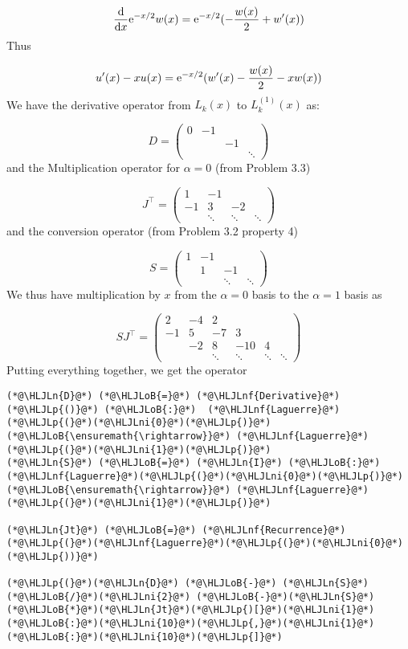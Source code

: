\documentclass[12pt,a4paper]{article}
\newcommand{\HLJLn}[1]{#1}
\newcommand{\HLJLnf}[1]{\textcolor[RGB]{66,102,213}{#1}}
\newcommand{\HLJLni}[1]{\textcolor[RGB]{59,151,46}{#1}}
\newcommand{\HLJLoB}[1]{\textcolor[RGB]{102,102,102}{\textbf{#1}}}
\newcommand{\HLJLp}[1]{#1}
\def\D{ {\rm d} }
\def\E{ {\rm e} }
\def\dx{\D x}
\begin{document}
\[
{\D \over \dx} \E^{-x/2} w(x) =  \E^{-x/2} (-{w(x) \over 2} +w'(x))
\]
Thus

\[
u'(x) - xu(x)  = \E^{-x/2} (w'(x) -{w(x) \over 2} - x w(x))
\]
We have the derivative operator from $L_k(x)$ to $L_k^{(1)}(x)$ as:

\[
D = \begin{pmatrix}
0 & -1 \\
  &&-1 \\
  &&&\ddots
\end{pmatrix}
\]
and the Multiplication operator for $\alpha = 0$ (from Problem 3.3)

\[
J^\top = \begin{pmatrix} 1 &-1\\
                        -1 & 3 &-2\\
                            &\ddots & \ddots & \ddots
                            \end{pmatrix}
\]
and the conversion operator (from Problem 3.2 property 4)

\[
S = \begin{pmatrix}
        1 & -1 \\ & 1 & -1 \\&&\ddots & \ddots
\end{pmatrix}
\]
We thus have multiplication by $x$ from the $\alpha = 0$ basis to the $\alpha = 1$ basis as

\[
S J^\top = \begin{pmatrix}
2 & -4 & 2 \\
-1 & 5 & -7 & 3 \\
& -2 & 8 & -10 & 4\\
&&\ddots&\ddots&\ddots&\ddots
\end{pmatrix}
\]
Putting everything together, we get the operator


\begin{lstlisting}
(*@\HLJLn{D}@*) (*@\HLJLoB{=}@*) (*@\HLJLnf{Derivative}@*)(*@\HLJLp{()}@*) (*@\HLJLoB{:}@*)  (*@\HLJLnf{Laguerre}@*)(*@\HLJLp{(}@*)(*@\HLJLni{0}@*)(*@\HLJLp{)}@*) (*@\HLJLoB{\ensuremath{\rightarrow}}@*) (*@\HLJLnf{Laguerre}@*)(*@\HLJLp{(}@*)(*@\HLJLni{1}@*)(*@\HLJLp{)}@*)
(*@\HLJLn{S}@*) (*@\HLJLoB{=}@*) (*@\HLJLn{I}@*) (*@\HLJLoB{:}@*) (*@\HLJLnf{Laguerre}@*)(*@\HLJLp{(}@*)(*@\HLJLni{0}@*)(*@\HLJLp{)}@*) (*@\HLJLoB{\ensuremath{\rightarrow}}@*) (*@\HLJLnf{Laguerre}@*)(*@\HLJLp{(}@*)(*@\HLJLni{1}@*)(*@\HLJLp{)}@*)

(*@\HLJLn{Jt}@*) (*@\HLJLoB{=}@*) (*@\HLJLnf{Recurrence}@*)(*@\HLJLp{(}@*)(*@\HLJLnf{Laguerre}@*)(*@\HLJLp{(}@*)(*@\HLJLni{0}@*)(*@\HLJLp{))}@*)

(*@\HLJLp{(}@*)(*@\HLJLn{D}@*) (*@\HLJLoB{-}@*) (*@\HLJLn{S}@*)(*@\HLJLoB{/}@*)(*@\HLJLni{2}@*) (*@\HLJLoB{-}@*)(*@\HLJLn{S}@*)(*@\HLJLoB{*}@*)(*@\HLJLn{Jt}@*)(*@\HLJLp{)[}@*)(*@\HLJLni{1}@*)(*@\HLJLoB{:}@*)(*@\HLJLni{10}@*)(*@\HLJLp{,}@*)(*@\HLJLni{1}@*)(*@\HLJLoB{:}@*)(*@\HLJLni{10}@*)(*@\HLJLp{]}@*)
\end{lstlisting}
\end{document}
